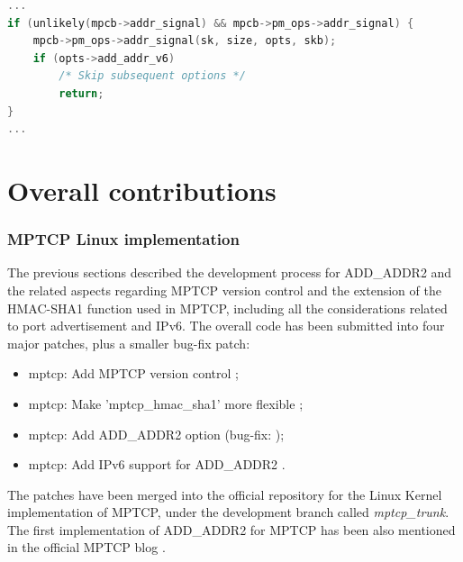 \begin{lstlisting}[language=c, caption=Other MPTCP options are not added to the outgoing packet if ADD\_ADDR2 is present (IPv6 case only), label=ipv6]
...
if (unlikely(mpcb->addr_signal) && mpcb->pm_ops->addr_signal) {
	mpcb->pm_ops->addr_signal(sk, size, opts, skb);
	if (opts->add_addr_v6)
		/* Skip subsequent options */
		return;
}
...
\end{lstlisting}


\section{Overall contributions}
\label{otherc}

\subsubsection{MPTCP Linux implementation}
The previous sections described the development process for ADD\_ADDR2 and the related aspects regarding MPTCP version control and the extension of the HMAC-SHA1 function used in MPTCP, including all the considerations related to port advertisement and IPv6.
The overall code has been submitted into four major patches, plus a smaller bug-fix patch:

\begin{itemize}
  \item mptcp: Add MPTCP version control \cite{patch1};
  \item mptcp: Make 'mptcp\_hmac\_sha1' more flexible \cite{patch2};
  \item mptcp: Add ADD\_ADDR2 option \cite{patch3} (bug-fix: \cite{patch5});
  \item mptcp: Add IPv6 support for ADD\_ADDR2 \cite{patch4}.
\end{itemize}

The patches have been merged into the official repository for the Linux Kernel implementation of MPTCP, under the development branch called \textit{mptcp\_trunk}.
The first implementation of ADD\_ADDR2 for MPTCP has been also mentioned in the official MPTCP blog \cite{blog}.

